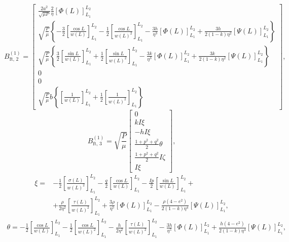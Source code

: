 \begin{equation*}
B_{\text{ft, 2}}^{(1)} =
    \begin{bmatrix}
        \frac{2a^{2}}{\sqrt{\mu P}} \frac{2}{\eta} \left[ \Phi(L) \right]_{L_1}^{L_2} \\
        \sqrt{\frac{P}{\mu}} \left\{ -\frac{3}{2} \left[ \frac{\cos L}{w(L)} \right]_{L_1}^{L_2} -
        \frac{1}{2} \left[ \frac{\cos L}{w(L)^2} \right]_{L_1}^{L_2} -
        \frac{3h}{\eta^3} \left[ \Phi(L) \right]_{L_1}^{L_2} +
        \frac{3h}{2 (1 - k) \eta^2} \left[ \Psi(L) \right]_{L_1}^{L_2} \right\} \\
        \sqrt{\frac{P}{\mu}} \left\{ \frac{3}{2} \left[ \frac{\sin L}{w(L)} \right]_{L_1}^{L_2} +
        \frac{1}{2} \left[ \frac{\sin L}{w(L)^2} \right]_{L_1}^{L_2} -
        \frac{3k}{\eta^3} \left[ \Phi(L) \right]_{L_1}^{L_2} +
        \frac{3k}{2 (1 - k) \eta^2} \left[ \Psi(L) \right]_{L_1}^{L_2} \right\} \\
        0 \\
        0 \\
        \sqrt{\frac{P}{\mu}} b \left\{ \left[ \frac{1}{w(L)} \right]_{L_1}^{L_2} +
        \frac{1}{2} \left[ \frac{1}{w(L)^2} \right]_{L_1}^{L_2} \right\}
    \end{bmatrix},
\end{equation*}
\begin{equation*}
B_{\text{ft, 3}}^{(1)} = \sqrt{\frac{P}{\mu}} 
    \begin{bmatrix}
        0 \\
        kI \xi \\
        -hI \xi \\
        \frac{1 + p^2 + q^2}{2} \theta \\
        \frac{1 + p^2 + q^2}{2} I \zeta \\
        I \xi
    \end{bmatrix},
\end{equation*}
\begin{align*}
    \xi = &-\frac{1}{2} \left[ \frac{\sigma(L)}{w(L)^2} \right]_{L_1}^{L_2} -
    \frac{q}{2} \left[ \frac{\cos L}{w(L)} \right]_{L_1}^{L_2} -
    \frac{Ip}{2} \left[ \frac{\sin L}{w(L)} \right]_{L_1}^{L_2} + \\
    &+\frac{\rho}{2 \eta^2} \left[ \frac{\tau(L)}{w(L)^2} \right]_{L_1}^{L_2} +
    \frac{3 \rho}{\eta^5} \left[ \Phi(L) \right]_{L_1}^{L_2} -
    \frac{\rho (4 - e^2)}{2 (1 - k) \eta^4} \left[ \Psi(L) \right]_{L_1}^{L_2},
\end{align*}
\begin{align*}
    \theta = -\frac{1}{2} \left[ \frac{\cos L}{w(L)} \right]_{L_1}^{L_2} -
    \frac{1}{2} \left[ \frac{\cos L}{w(L)^2} \right]_{L_1}^{L_2} -
    \frac{h}{2 \eta^2} \left[ \frac{\tau(L)}{w(L)^2} \right]_{L_1}^{L_2} -
    \frac{3h}{\eta^5} \left[ \Phi(L) \right]_{L_1}^{L_2} +
    \frac{h (4 - e^2)}{2 (1 - k) \eta^4} \left[ \Psi(L) \right]_{L_1}^{L_2},
\end{align*}
